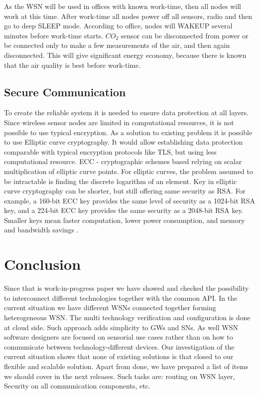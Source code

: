 \documentclass[journal]{IEEEtran}
\begin{document}
As the WSN will be used in offices with known work-time, then all nodes will work at this time. After work-time all nodes power off all sensors, radio and then go to deep SLEEP mode. According to office, nodes will WAKEUP several minutes before work-time starts. $CO_2$ sensor can be disconnected from power or be connected only to make a few measurements of the air, and then again disconnected. This will give significant energy economy, because there is known that the air quality is best before work-time.
\subsection{Secure Communication}
To create the reliable system it is needed to ensure data protection at all layers. Since wireless sensor nodes are limited in computational resources, it is not possible to use typical encryption. As a solution to existing problem it is possible to use Elliptic curve cryptography. It would allow establishing data protection comparable with typical encryption protocols like TLS, but using less computational resource. ECC - cryptographic schemes based relying on scalar multiplication of elliptic curve points. For elliptic curves, the problem assumed to be intractable is finding the discrete logarithm of an element. \cite {ECC} Key in elliptic curve cryptography can be shorter, but still offering same security as RSA. For example, a 160-bit ECC key provides the same level of security as a 1024-bit RSA key, and a 224-bit ECC key provides the same security as a 2048-bit RSA key. Smaller keys mean faster computation, lower power consumption, and memory and bandwidth savings \cite{Huge}.
\section{Conclusion}
Since that is work-in-progress paper we have showed and checked the possibility to interconnect different technologies together with the common API. 
In the current situation we have different WSNs connected together forming heterogeneous WSN. The multi technology verification and configuration is done at cloud side. Such approach adds simplicity to GWs and SNs. As well WSN software designers are focused on sensorial use cases rather than on how to communicate between technology-different devices.
Our investigation of the current situation shows that none of existing solutions is that closed to our flexible and scalable solution.
Apart from done, we have prepared a list of items we should cover in the next releases. Such tasks are: routing on WSN layer, Security on all communication components, etc.
\end{document}
